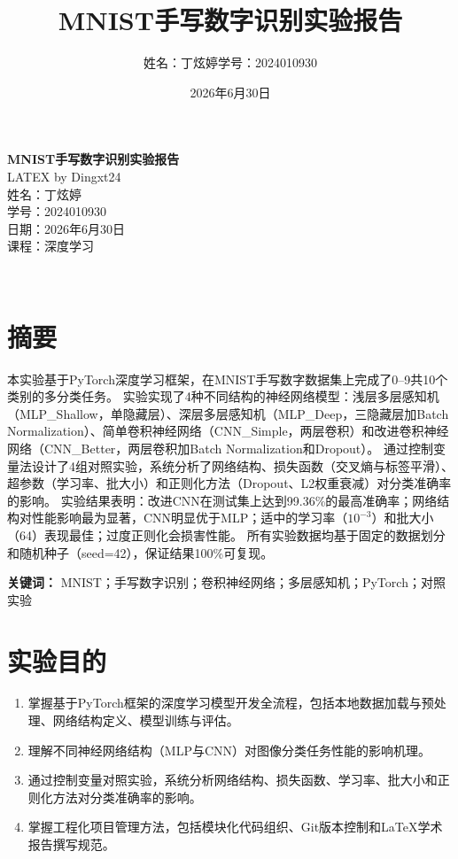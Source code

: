 \documentclass[12pt,a4paper]{ctexart}
\title{\huge\bfseries MNIST手写数字识别实验报告}
\author{\large 姓名：丁炫婷\quad 学号：2024010930}
\date{\large 2026年6月30日}
\begin{document}
\begin{titlepage}
\centering
\vspace*{4cm}
{\huge\bfseries MNIST手写数字识别实验报告}\\[1.5cm]
{\large LATEX by Dingxt24}\\[0.5cm]
{\large 姓名：丁炫婷}\\[0.3cm]
{\large 学号：2024010930}\\[0.3cm]
{\large 日期：2026年6月30日}\\[0.3cm]
{\large 课程：深度学习}\\[4cm]
\begin{center}
\makebox[10cm]{\hrulefill}\\[0.8cm]
\makebox[10cm]{\hrulefill}
\end{center}
\vfill
\end{titlepage}

\section*{摘\quad 要}
本实验基于PyTorch深度学习框架，在MNIST手写数字数据集上完成了0--9共10个类别的多分类任务。
实验实现了4种不同结构的神经网络模型：浅层多层感知机（MLP\_Shallow，单隐藏层）、深层多层感知机（MLP\_Deep，三隐藏层加Batch Normalization）、简单卷积神经网络（CNN\_Simple，两层卷积）和改进卷积神经网络（CNN\_Better，两层卷积加Batch Normalization和Dropout）。
通过控制变量法设计了4组对照实验，系统分析了网络结构、损失函数（交叉熵与标签平滑）、超参数（学习率、批大小）和正则化方法（Dropout、L2权重衰减）对分类准确率的影响。
实验结果表明：改进CNN在测试集上达到99.36\%的最高准确率；网络结构对性能影响最为显著，CNN明显优于MLP；适中的学习率（$10^{-3}$）和批大小（64）表现最佳；过度正则化会损害性能。
所有实验数据均基于固定的数据划分和随机种子（seed=42），保证结果100\%可复现。

\vspace{0.3cm}
\noindent\textbf{关键词：} MNIST；手写数字识别；卷积神经网络；多层感知机；PyTorch；对照实验

\newpage
\tableofcontents
\newpage

\section{实验目的}

\begin{enumerate}
  \item 掌握基于PyTorch框架的深度学习模型开发全流程，包括本地数据加载与预处理、网络结构定义、模型训练与评估。
  \item 理解不同神经网络结构（MLP与CNN）对图像分类任务性能的影响机理。
  \item 通过控制变量对照实验，系统分析网络结构、损失函数、学习率、批大小和正则化方法对分类准确率的影响。
  \item 掌握工程化项目管理方法，包括模块化代码组织、Git版本控制和LaTeX学术报告撰写规范。
\end{enumerate}
\end{document}

